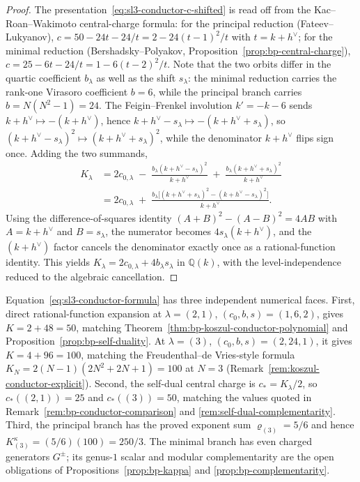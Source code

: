 \begin{proof}
The presentation~\eqref{eq:sl3-conductor-c-shifted} is read off from
the Kac--Roan--Wakimoto central-charge formula: for the principal
reduction \textup{(}Fateev--Lukyanov\textup{)},
$c = 50 - 24t - 24/t = 2 - 24(t-1)^2/t$ with $t = k + h^\vee$;
for the minimal reduction \textup{(}Bershadsky--Polyakov,
Proposition~\textup{\ref{prop:bp-central-charge}}\textup{)},
$c = 25 - 6t - 24/t = 1 - 6(t-2)^2/t$. Note that the two orbits
differ in the quartic coefficient $b_\lambda$ as well as the shift
$s_\lambda$: the minimal reduction carries the rank-one Virasoro
coefficient $b=6$, while the principal branch carries
$b=N(N^2{-}1)=24$.
The Feigin--Frenkel involution $k' = -k - 6$ sends
$k + h^\vee \mapsto -(k + h^\vee)$, hence
$k + h^\vee - s_\lambda \mapsto -(k + h^\vee + s_\lambda)$, so
$(k + h^\vee - s_\lambda)^2 \mapsto (k + h^\vee + s_\lambda)^2$,
while the denominator $k + h^\vee$ flips sign once.
Adding the two summands,
\begin{align*}
K_\lambda
&= 2c_{0,\lambda} \;-\; \frac{b_\lambda(k + h^\vee - s_\lambda)^2}{k + h^\vee}
 \;+\; \frac{b_\lambda(k + h^\vee + s_\lambda)^2}{k + h^\vee} \\
&= 2c_{0,\lambda} \;+\; \frac{b_\lambda\bigl[(k + h^\vee + s_\lambda)^2
 - (k + h^\vee - s_\lambda)^2\bigr]}{k + h^\vee}.
\end{align*}
Using the difference-of-squares identity
$(A + B)^2 - (A - B)^2 = 4AB$ with $A = k + h^\vee$ and $B = s_\lambda$,
the numerator becomes $4 s_\lambda (k + h^\vee)$, and the
$(k + h^\vee)$ factor cancels the denominator exactly once as a
rational-function identity.
This yields $K_\lambda = 2c_{0,\lambda} + 4 b_\lambda s_\lambda$ in
$\mathbb{Q}(k)$, with
the level-independence reduced to the algebraic cancellation.
\end{proof}

\begin{remark}
\label{rem:sl3-conductor-verification}%
Equation~\eqref{eq:sl3-conductor-formula} has three independent
numerical faces.
First, direct rational-function expansion at $\lambda = (2,1)$,
$(c_0, b, s) = (1, 6, 2)$, gives
$K = 2 + 48 = 50$, matching
Theorem~\textup{\ref{thm:bp-koszul-conductor-polynomial}} and
Proposition~\textup{\ref{prop:bp-self-duality}}.
At $\lambda = (3)$, $(c_0, b, s) = (2, 24, 1)$, it gives $K = 4 + 96 = 100$,
matching the Freudenthal--de Vries-style formula
$K_N = 2(N{-}1)(2N^2 + 2N + 1) = 100$ at $N = 3$
\textup{(}Remark~\textup{\ref{rem:koszul-conductor-explicit}})\textup{.}
Second, the self-dual central charge is $c_* = K_\lambda / 2$, so
$c_*((2,1)) = 25$ and $c_*((3)) = 50$, matching the values quoted in
Remark~\textup{\ref{rem:bp-conductor-comparison}} and
\textup{\ref{rem:self-dual-complementarity}}.
Third, the principal branch has the proved exponent sum
$\varrho_{(3)}=5/6$ and hence
$K^\kappa_{(3)}=(5/6)(100)=250/3$.  The minimal branch has even
charged generators $G^\pm$; its genus-$1$ scalar and modular
complementarity are the open obligations of
Propositions~\textup{\ref{prop:bp-kappa}} and
\textup{\ref{prop:bp-complementarity}}.
\end{remark}

